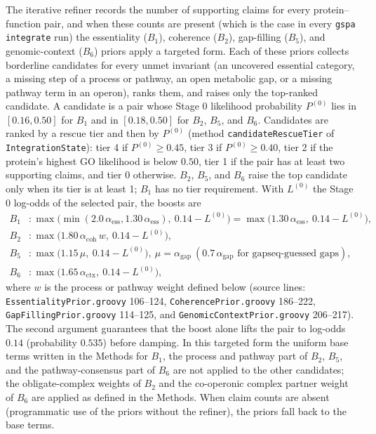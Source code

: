 \documentclass[10pt]{article}
\begin{document}
The iterative refiner records the number of supporting claims for every protein--function pair, and when these counts are present (which is the case in every \texttt{gspa integrate} run) the essentiality ($B_1$), coherence ($B_2$), gap-filling ($B_5$), and genomic-context ($B_6$) priors apply a targeted form. Each of these priors collects borderline candidates for every unmet invariant (an uncovered essential category, a missing step of a process or pathway, an open metabolic gap, or a missing pathway term in an operon), ranks them, and raises only the top-ranked candidate. A candidate is a pair whose Stage 0 likelihood probability $P^{(0)}$ lies in $[0.16, 0.50]$ for $B_1$ and in $[0.18, 0.50]$ for $B_2$, $B_5$, and $B_6$. Candidates are ranked by a rescue tier and then by $P^{(0)}$ (method \texttt{candidateRescueTier} of \texttt{IntegrationState}): tier 4 if $P^{(0)} \ge 0.45$, tier 3 if $P^{(0)} \ge 0.40$, tier 2 if the protein's highest GO likelihood is below $0.50$, tier 1 if the pair has at least two supporting claims, and tier 0 otherwise. $B_2$, $B_5$, and $B_6$ raise the top candidate only when its tier is at least 1; $B_1$ has no tier requirement. With $L^{(0)}$ the Stage 0 log-odds of the selected pair, the boosts are
\begin{align*}
  B_1 &: \max\bigl(\min(2.0\,\alpha_{\text{ess}}, 1.30\,\alpha_{\text{ess}}),\ 0.14 - L^{(0)}\bigr) = \max\bigl(1.30\,\alpha_{\text{ess}},\ 0.14 - L^{(0)}\bigr),\\
  B_2 &: \max\bigl(1.80\,\alpha_{\text{coh}}\,w,\ 0.14 - L^{(0)}\bigr),\\
  B_5 &: \max\bigl(1.15\,\mu,\ 0.14 - L^{(0)}\bigr),\ \mu = \alpha_{\text{gap}}\ (0.7\,\alpha_{\text{gap}}\text{ for gapseq-guessed gaps}),\\
  B_6 &: \max\bigl(1.65\,\alpha_{\text{ctx}},\ 0.14 - L^{(0)}\bigr),
\end{align*}
where $w$ is the process or pathway weight defined below (source lines: \texttt{EssentialityPrior.groovy} 106--124, \texttt{CoherencePrior.groovy} 186--222, \texttt{GapFillingPrior.groovy} 114--125, and \texttt{GenomicContextPrior.groovy} 206--217). The second argument guarantees that the boost alone lifts the pair to log-odds $0.14$ (probability $0.535$) before damping. In this targeted form the uniform base terms written in the Methods for $B_1$, the process and pathway part of $B_2$, $B_5$, and the pathway-consensus part of $B_6$ are not applied to the other candidates; the obligate-complex weights of $B_2$ and the co-operonic complex partner weight of $B_6$ are applied as defined in the Methods. When claim counts are absent (programmatic use of the priors without the refiner), the priors fall back to the base terms.
\end{document}
